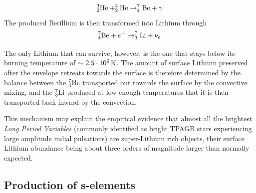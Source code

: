 \begin{equation*}
    \element{He}{3}{2}+\element{He}{4}{2}\to \element{Be}{7}{4}+\gamma
\end{equation*}
The produced Berillium is then transformed into Lithium through
\begin{equation*}
    \element{Be}{7}{4}+e^{-}\to \element{Li}{7}{3}+\nu_{e}
\end{equation*}
\par The only Lithium that can survive, however, is the one that stays below its burning temperature of $\sim 2.5\power{10}{6}\unit{K}$. The amount of surface Lithium preserved after the envelope retreats towards the surface is therefore determined by the balance between the $\element{Be}{7}{4}$ transported out towards the surface by the convective mixing, and the $\element{Li}{7}{3}$ produced at low enough temperatures that it is then transported back inward by the convection.
\par This mechanism may explain the empirical evidence that almost all the brightest \emph{Long Period Variables} (commonly identified as bright TPAGB stars experiencing large amplitude radial pulsations) are super-Lithium rich objects, their surface Lithium abundance being about three orders of magnitude larger than normally expected.

\subsection{Production of s-elements}

